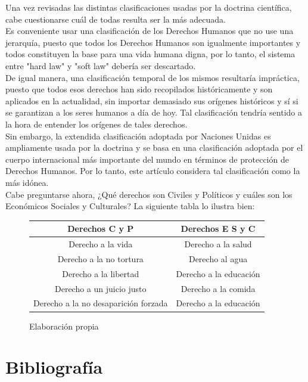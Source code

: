 \documentclass[10pt,a4paper]{article}
\begin{document}
Una vez revisadas las distintas clasificaciones usadas por la doctrina científica, cabe cuestionarse cuál de todas resulta ser la más adecuada.\\

Es conveniente usar una clasificación de los Derechos Humanos que no use una jerarquía, puesto que todos los Derechos Humanos son igualmente importantes y todos constituyen la base para una vida humana digna, por lo tanto, el sistema entre "hard law" y "soft law" debería ser descartado.\\
De igual manera, una clasificación temporal de los mismos resultaría impráctica, puesto que todos esos derechos han sido recopilados históricamente y son aplicados en la actualidad, sin importar demasiado sus orígenes históricos y sí si se garantizan a los seres humanos a día de hoy. Tal clasificación tendría sentido a la hora de entender los orígenes de tales derechos.\\
Sin embargo, la extendida clasificación adoptada por Naciones Unidas es ampliamente usada por la doctrina y se basa en una clasificación adoptada por el cuerpo internacional más importante del mundo en términos de protección de Derechos Humanos. Por lo tanto, este artículo considera tal clasificación como la más idónea.\\
Cabe preguntarse ahora, ¿Qué derechos son Civiles y Políticos y cuáles son los Económicos Sociales y Culturales? La siguiente tabla lo ilustra bien:

\begin{figure}[h]
\begin{center}
\begin{tabular}{ |c|c|  }
 \hline
 \textbf{Derechos C y P} & \textbf{Derechos E S y C}\\ 
  \hline
 Derecho a la vida & Derecho a la salud\\  
 Derecho a la no tortura & Derecho al agua\\
 Derecho a la libertad & Derecho a la educación\\
 Derecho a un juicio justo & Derecho a la comida\\
 Derecho a la no desaparición forzada & Derecho a la educación\\
 \hline 
\end{tabular}
\end{center}

\caption{Elaboración propia}
\end{figure}
\newpage
\section{Bibliografía}
\end{document}
